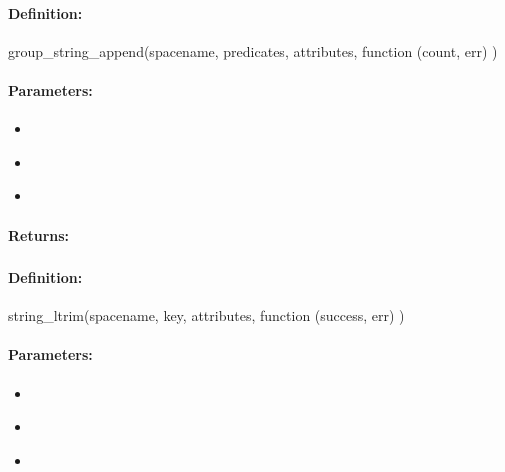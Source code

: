 \paragraph{Definition:}
\begin{javascriptcode}
group_string_append(spacename, predicates, attributes, function (count, err) {})
\end{javascriptcode}
\paragraph{Parameters:}
\begin{itemize}[noitemsep]
\item {}\\

\item {}\\

\item {}\\

\end{itemize}

\paragraph{Returns:}


\pagebreak
\subsubsection{}
\label{api:nodejs:string_ltrim}


\paragraph{Definition:}
\begin{javascriptcode}
string_ltrim(spacename, key, attributes, function (success, err) {})
\end{javascriptcode}
\paragraph{Parameters:}
\begin{itemize}[noitemsep]
\item {}\\

\item {}\\

\item {}\\

\end{itemize}

